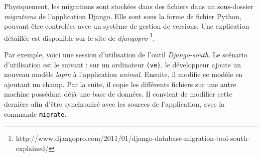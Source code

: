 \documentclass[a4paper,12pt]{article}
\begin{document}
Physiquement, les migrations sont stockées dans des fichiers dans un sous-dossier
\textit{migrations} de l'application Django. Elle sont sous la forme de fichier
Python, pouvant être controlées avec un système de gestion de versions. Une explication
détaillée est disponible sur le site de \textit{djangopro}
\footnote{http://www.djangopro.com/2011/01/django-database-migration-tool-south-explained/}.

Par exemple, voici une session d'utilisation de l'outil \textit{Django-south}.
Le scénario d'utilisation est le suivant : sur un ordinateur \texttt{(ve)}, le développeur
ajoute un nouveau modèle \textit{lapin} à l'application \textit{animal}. Ensuite,
il modifie ce modèle en ajoutant un champ. Par la suite, il copie les différents
fichiers sur une autre machine possédant déjà une base de données. Il convient de
modifier cette dernière afin d'être synchronisé avec les sources de l'application,
avec la commande \texttt{migrate}.
\end{document}
